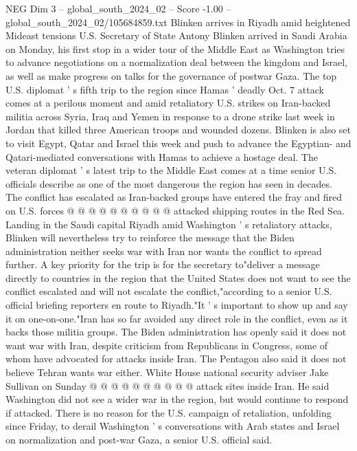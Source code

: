 \begin{textsample}{NEG Dim 3 – global\_south\_2024\_02 – Score -1.00 – global\_south\_2024\_02/105684859.txt}  \label{ex:f3_neg_086}
Blinken arrives in Riyadh amid heightened Mideast tensions U.S.
Secretary of State Antony Blinken arrived in Saudi Arabia on Monday, his first stop in a wider tour of the Middle East as Washington tries to advance negotiations on a normalization deal between the kingdom and Israel, as well as make progress on talks for the governance of postwar Gaza.
The top U.S. diplomat ' s fifth trip to the region since Hamas ' deadly Oct. 7 attack comes at a perilous moment and amid retaliatory U.S. strikes on Iran-backed militia across Syria, Iraq and Yemen in response to a drone strike last week in Jordan that killed three American troops and wounded dozens.
Blinken is also set to visit Egypt, Qatar and Israel this week and push to advance the Egyptian- and Qatari-mediated conversations with Hamas to achieve a hostage deal.
The veteran diplomat ' s latest trip to the Middle East comes at a time senior U.S. officials describe as one of the most dangerous the region has seen in decades.
The conflict has escalated as Iran-backed groups have entered the fray and fired on U.S. forces @ @ @ @ @ @ @ @ @ @ attacked shipping routes in the Red Sea.
Landing in the Saudi capital Riyadh amid Washington ' s retaliatory attacks, Blinken will nevertheless try to reinforce the message that the Biden administration neither seeks war with Iran nor wants the conflict to spread further.
A key priority for the trip is for the secretary to"deliver a message directly to countries in the region that the United States does not want to see the conflict escalated and will not escalate the conflict,"according to a senior U.S. official briefing reporters en route to Riyadh."It ' s important to show up and say it on one-on-one."Iran has so far avoided any direct role in the conflict, even as it backs those militia groups.
The Biden administration has openly said it does not want war with Iran, despite criticism from Republicans in Congress, some of whom have advocated for attacks inside Iran.
The Pentagon also said it does not believe Tehran wants war either.
White House national security adviser Jake Sullivan on Sunday @ @ @ @ @ @ @ @ @ @ attack sites inside Iran.
He said Washington did not see a wider war in the region, but would continue to respond if attacked.
There is no reason for the U.S. campaign of retaliation, unfolding since Friday, to derail Washington ' s conversations with Arab states and Israel on normalization and post-war Gaza, a senior U.S. official said.

\end{textsample}
